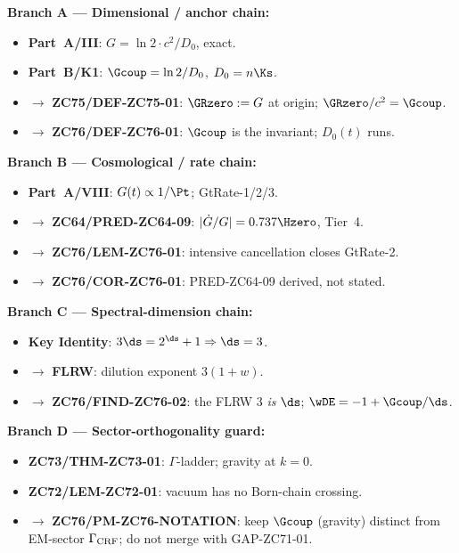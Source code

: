 \documentclass[12pt, a4paper]{article}
\begin{document}
\begin{genealogybox}[title={How ZC76's Key Objects Trace Back}]

\textbf{Branch A --- Dimensional / anchor chain:}
\begin{itemize}[leftmargin=2em, noitemsep]
  \item \textbf{Part~A/III}: $G = \ln2\cdot c^2/D_0$, exact.
  \item \textbf{Part~B/K1}: $\Gcoup = \ln2/D_0$, $D_0 = n\Ks$.
  \item $\to$ \textbf{ZC75/DEF-ZC75-01}: $\GRzero := G$ at origin;
    $\GRzero/c^2 = \Gcoup$.
  \item $\to$ \textbf{ZC76/DEF-ZC76-01}: $\Gcoup$ is the invariant;
    $D_0(t)$ runs.
\end{itemize}

\textbf{Branch B --- Cosmological / rate chain:}
\begin{itemize}[leftmargin=2em, noitemsep]
  \item \textbf{Part~A/VIII}: $G(t)\propto 1/\Pt$; GtRate-1/2/3.
  \item $\to$ \textbf{ZC64/PRED-ZC64-09}: $|\dot G/G|=0.737\Hzero$, Tier~4.
  \item $\to$ \textbf{ZC76/LEM-ZC76-01}: intensive cancellation closes
    GtRate-2.
  \item $\to$ \textbf{ZC76/COR-ZC76-01}: PRED-ZC64-09 derived, not stated.
\end{itemize}

\textbf{Branch C --- Spectral-dimension chain:}
\begin{itemize}[leftmargin=2em, noitemsep]
  \item \textbf{Key Identity}: $3\ds = 2^{\ds}+1 \Rightarrow \ds=3$.
  \item $\to$ \textbf{FLRW}: dilution exponent $3(1+w)$.
  \item $\to$ \textbf{ZC76/FIND-ZC76-02}: the FLRW $3$ \emph{is} $\ds$;
    $\wDE = -1 + \Gcoup/\ds$.
\end{itemize}

\textbf{Branch D --- Sector-orthogonality guard:}
\begin{itemize}[leftmargin=2em, noitemsep]
  \item \textbf{ZC73/THM-ZC73-01}: $\Gamma$-ladder; gravity at $k=0$.
  \item \textbf{ZC72/LEM-ZC72-01}: vacuum has no Born-chain crossing.
  \item $\to$ \textbf{ZC76/PM-ZC76-NOTATION}: keep $\Gcoup$ (gravity)
    distinct from EM-sector $\Gamma_{\rm CRF}$; do not merge with
    GAP-ZC71-01.
\end{itemize}


\end{genealogybox}
\end{document}
